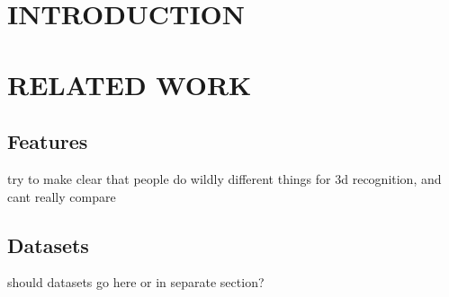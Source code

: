 
\section{INTRODUCTION}


\section{RELATED WORK}

\subsection{Features}
try to make clear that people do wildly different things for 3d recognition, and cant really compare

\subsection{Datasets}
should datasets go here or in separate section?